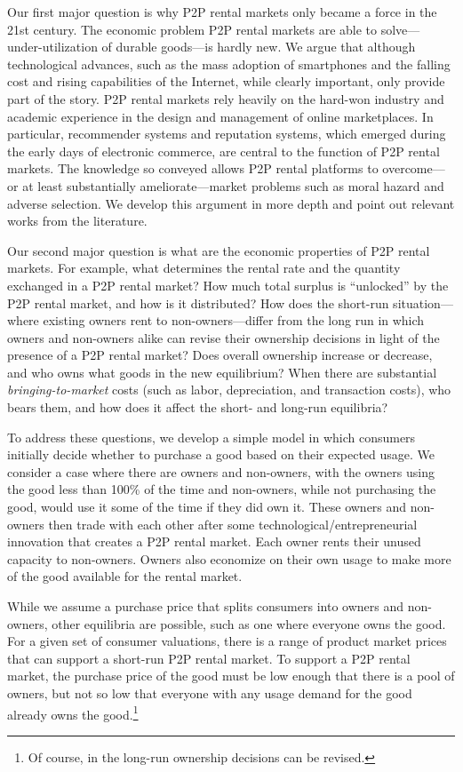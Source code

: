 \documentclass[11pt]{article}
\begin{document}
Our first major question is why P2P rental markets only became a force in the 21st century. 
The economic problem P2P rental markets are able to solve---under-utilization of durable goods---is hardly new.  
We argue that although technological advances, such as the mass adoption of smartphones and the falling cost and rising capabilities of the Internet, while clearly important, only provide part of the story. 
P2P rental markets rely heavily on the hard-won industry and academic experience in the design and management of online marketplaces.
In particular, recommender systems and reputation systems, which emerged during the early days of electronic commerce, are central to the function of P2P rental markets. 
The knowledge so conveyed allows P2P rental platforms to overcome---or at least substantially ameliorate---market problems such as moral hazard and adverse selection.  
We develop this argument in more depth and point out relevant works from the literature. 

Our second major question is what are the economic properties of P2P rental markets. 
For example, what determines the rental rate and the quantity exchanged in a P2P rental market? 
How much total surplus is ``unlocked'' by the P2P rental market, and how is it distributed? 
How does the short-run situation---where existing owners rent to non-owners---differ from the long run in which owners and non-owners alike can revise their ownership decisions in light of the presence of a P2P rental market?
Does overall ownership increase or decrease, and who owns what goods in the new equilibrium?
When there are substantial \emph{bringing-to-market} costs (such as labor, depreciation, and transaction costs), who bears them, and how does it affect the short- and long-run equilibria? 

To address these questions, we develop a simple model in which consumers initially decide whether to purchase a good based on their expected usage.
We consider a case where there are owners and non-owners, with the owners using the good less than 100\% of the time and non-owners, while not purchasing the good, would use it some of the time if they did own it. 
These owners and non-owners then trade with each other after some technological/entrepreneurial innovation that creates a P2P rental market.
Each owner rents their unused capacity to non-owners.
Owners also economize on their own usage to make more of the good available for the rental market.

While we assume a purchase price that splits consumers into owners and non-owners, other equilibria are possible, such as one where everyone owns the good.
For a given set of consumer valuations, there is a range of product market prices that can support a short-run P2P rental market.
To support a P2P rental market, the purchase price of the good must be low enough that there is a pool of owners, but not so low that everyone with any usage demand for the good already owns the good.\footnote{
  Of course, in the long-run ownership decisions can be revised.
}   
\end{document}
